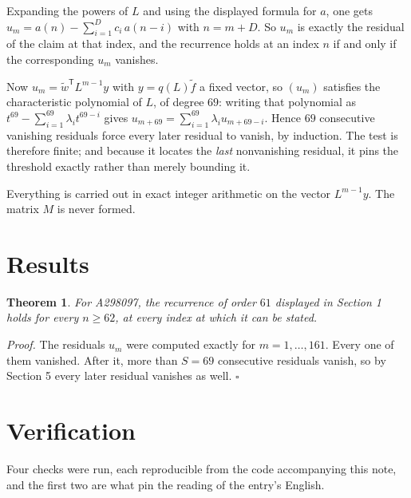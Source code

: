 \documentclass[11pt]{article}
\newtheorem{theorem}{Theorem}
\theoremstyle{definition}
\begin{document}
Expanding the powers of $L$ and using the displayed formula for $a$, one gets $u_m = a(n) - \sum_{i=1}^{D} c_i\,a(n-i)$ with $n = m + D$. So $u_m$ is exactly the residual of the claim at that index, and the recurrence holds at an index $n$ if and only if the corresponding $u_m$ vanishes.

Now $u_m = \tilde w^{\mathsf T} L^{m-1} y$ with $y = q(L)\tilde f$ a fixed vector, so $(u_m)$ satisfies the characteristic polynomial of $L$, of degree $69$: writing that polynomial as $t^{69} - \sum_{i=1}^{69} \lambda_i t^{69-i}$ gives $u_{m+69} = \sum_{i=1}^{69} \lambda_i u_{m+69-i}$. Hence $69$ consecutive vanishing residuals force every later residual to vanish, by induction. The test is therefore finite; and because it locates the {\itshape last} nonvanishing residual, it pins the threshold exactly rather than merely bounding it.

Everything is carried out in exact integer arithmetic on the vector $L^{m-1}y$. The matrix $M$ is never formed.

\section{Results}

\begin{theorem} For A298097, the recurrence of order $61$ displayed in Section 1 holds for every $n \ge 62$, at every index at which it can be stated.\end{theorem}

{\itshape Proof.} The residuals $u_m$ were computed exactly for $m = 1,\dots,161$. Every one of them vanished. After it, more than $S = 69$ consecutive residuals vanish, so by Section 5 every later residual vanishes as well. $\square$

\section{Verification}

Four checks were run, each reproducible from the code accompanying this note, and the first two are what pin the reading of the entry's English.
\end{document}
